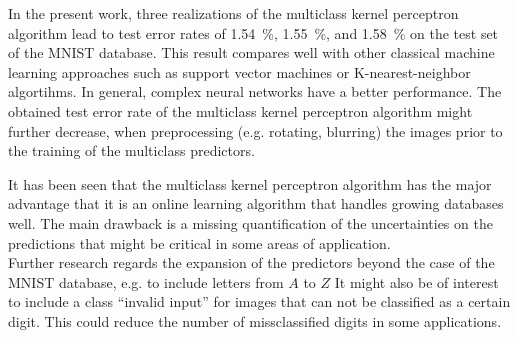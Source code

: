 In the present work, three realizations of the multiclass kernel perceptron algorithm lead to test error rates of \SI{1.54}{\percent}, \SI{1.55}{\percent}, and \SI{1.58}{\percent} on the test set of the MNIST database. This result compares well with other classical machine learning approaches such as support vector machines or K-nearest-neighbor algortihms. In general, complex neural networks have a better performance. The obtained test error rate of the multiclass kernel perceptron algorithm might further decrease, when preprocessing (e.g. rotating, blurring) the images prior to the training of the multiclass predictors. 

It has been seen that the multiclass kernel perceptron algorithm has the major advantage that it is an online learning algorithm that handles growing databases well. The main drawback is a missing quantification of the uncertainties on the predictions that might be critical in some areas of application.\\

Further research regards the expansion of the predictors beyond the case of the MNIST database, e.g. to include letters from $A$ to $Z$ \cite{EMNIST2017} It might also be of interest to include a class \enquote{invalid input} for images that can not be classified as a certain digit. This could reduce the number of missclassified digits in some applications.